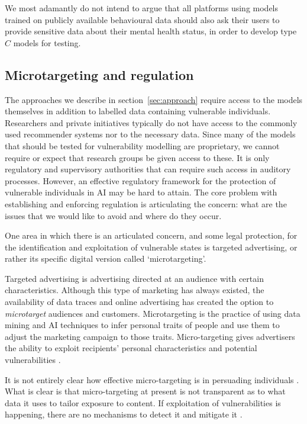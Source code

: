 \documentclass[11pt,theapa]{article}
\theoremstyle{plain}
\begin{document}
We most adamantly do not intend to argue that all platforms using models trained on publicly available behavioural data should also ask their users to provide sensitive data about their mental health status, in order to develop type $C$ models for testing. 
\subsection{Microtargeting and regulation}\label{sec:challenge_microtargeting}
The  approaches we describe in section~\ref{sec:approach} require access to the models themselves in addition to labelled data containing vulnerable individuals.
Researchers and private initiatives typically do not have access to the commonly used recommender systems nor to the necessary data. 
Since many of the models that should be tested for vulnerability modelling are proprietary, we cannot require or expect that research groups be given access to these. It is only regulatory and supervisory authorities that can require such access in auditory processes. However, an effective regulatory framework for the protection of vulnerable individuals in AI may be hard to attain. The core problem with establishing and enforcing regulation is articulating the concern: what are the issues that we would like to avoid and where do they occur. 


One area in which there is an articulated concern, and some legal protection, for the identification and  exploitation of vulnerable states is targeted advertising, or rather its specific digital version called `microtargeting'.

Targeted advertising is advertising directed at an audience with certain characteristics. Although this type of marketing has always existed, the availability of data traces and online advertising has created the option to {\em microtarget} audiences and customers. Microtargeting is the practice of  using data mining and AI techniques to infer personal traits of people and use them to adjust the marketing campaign to those traits. Micro-targeting  gives advertisers the ability to exploit recipients' personal characteristics and potential vulnerabilities \cite{Lorenz-Spreen2021}. 

It is not entirely clear how effective micro-targeting is in persuading individuals \cite{Rafieian2021,tappin2022}. What is clear is that micro-targeting at present is not transparent as to what data it uses to tailor exposure to content. If exploitation of vulnerabilities is happening, there are no mechanisms to detect it and mitigate it \cite{fare2022,Lorenz-Spreen2021}. 
\end{document}
